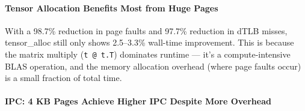 \documentclass[conference]{IEEEtran}
\begin{document}
\paragraph{Tensor Allocation Benefits Most from Huge Pages}

\begin{table}[H]
\caption{Tensor Allocation Performance}
\centering
{}
\end{table}

With a 98.7\% reduction in page faults and 97.7\% reduction in dTLB misses, tensor\_alloc still only shows 2.5--3.3\% wall-time improvement. This is because the matrix multiply (\texttt{t @ t.T}) dominates runtime --- it's a compute-intensive BLAS operation, and the memory allocation overhead (where page faults occur) is a small fraction of total time.

\paragraph{IPC: 4 KB Pages Achieve Higher IPC Despite More Overhead}

\begin{table}[H]
\caption{IPC Comparison}
\centering
{}
\end{table}
\end{document}
